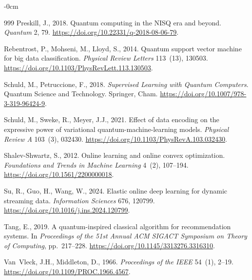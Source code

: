 \documentclass[sensors,article,submit,pdftex,moreauthors]{Definitions/mdpi}
\providecommand{\DIFadd}[1]{{\protect\color{blue}#1}} %
\providecommand{\DIFdel}[1]{} %
\providecommand{\DIFaddbegin}{} %
\providecommand{\DIFaddend}{} %
\providecommand{\DIFdelbegin}{} %
\providecommand{\DIFdelend}{} %
\begin{document}
\begin{adjustwidth}{-\extralength}{0cm}
\begin{thebibliography}{999}
Preskill, J., 2018.
\newblock Quantum computing in the NISQ era and beyond.
\newblock \emph{Quantum} 2, 79.
\newblock \url{https://doi.org/10.22331/q-2018-08-06-79}.

Rebentrost, P., Mohseni, M., Lloyd, S., 2014.
\newblock Quantum support vector machine for big data classification.
\newblock \emph{Physical Review Letters} 113~(13), 130503.
\newblock \url{https://doi.org/10.1103/PhysRevLett.113.130503}.

Schuld, M., Petruccione, F., 2018.
\newblock \emph{Supervised Learning with Quantum Computers}.
\newblock Quantum Science and Technology. Springer, Cham.
\newblock \url{https://doi.org/10.1007/978-3-319-96424-9}.

Schuld, M., Sweke, R., Meyer, J.J., 2021.
\newblock Effect of data encoding on the expressive power of variational quantum-machine-learning models.
\newblock \emph{Physical Review A} 103~(3), 032430.
\newblock \url{https://doi.org/10.1103/PhysRevA.103.032430}.

Shalev-Shwartz, S., 2012.
\newblock Online learning and online convex optimization.
\newblock \emph{Foundations and Trends in Machine Learning} 4~(2), 107--194.
\newblock \url{https://doi.org/10.1561/2200000018}.

Su, R., Guo, H., Wang, W., 2024.
\newblock Elastic online deep learning for dynamic streaming data.
\newblock \emph{Information Sciences} 676, \DIFdelbegin \DIFdel{120783.
}\DIFdelend \DIFaddbegin \DIFadd{120799.
}\DIFaddend \newblock \DIFdelbegin %
\DIFdelend \DIFaddbegin \url{https://doi.org/10.1016/j.ins.2024.120799}\DIFaddend .

Tang, E., 2019.
\newblock A quantum-inspired classical algorithm for recommendation systems.
\newblock In \emph{Proceedings of the 51st Annual ACM SIGACT Symposium on Theory of Computing}, pp.~217--228.
\newblock \url{https://doi.org/10.1145/3313276.3316310}\DIFaddbegin \DIFadd{.
}

\DIFadd{Van~Vleck, J.H., Middleton, D., 1966.
}\newblock \DIFadd{The spectrum of clipped noise.
}\newblock \emph{\DIFadd{Proceedings of the IEEE}} \DIFadd{54~(1), 2--19.
}\newblock \url{https://doi.org/10.1109/PROC.1966.4567}\DIFaddend .


\end{thebibliography}
\end{adjustwidth}
\end{document}
